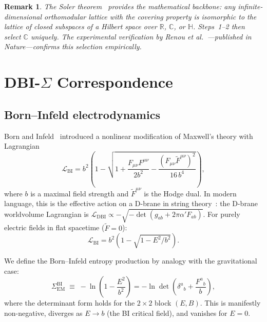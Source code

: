 \documentclass[prl,twocolumn,superscriptaddress,longbibliography]{revtex4-2}
\newtheorem*{remark}{Remark}
\newcommand{\Sem}{\Sigma_{\mathrm{EM}}}
\newcommand{\LBI}{\mathcal{L}_{\mathrm{BI}}}
\begin{document}
\begin{remark}
The Soler theorem~\cite{Solèr1995} provides the mathematical
backbone: any infinite-dimensional orthomodular lattice with
the covering property is isomorphic to the lattice of closed
subspaces of a Hilbert space over $\mathbb{R}$, $\mathbb{C}$,
or $\mathbb{H}$.
Steps~1--2 then select $\mathbb{C}$ uniquely.
The experimental verification by Renou
\textit{et al.}~\cite{Renou2021}---published in
\textit{Nature}---confirms this selection empirically.
\end{remark}

\section{DBI-$\Sigma$ Correspondence}
\label{sec:dbi}

\subsection{Born--Infeld electrodynamics}

Born and Infeld~\cite{BornInfeld1934} introduced a nonlinear
modification of Maxwell's theory with Lagrangian
\begin{equation}
  \LBI = b^2\!\left(1 - \sqrt{1 + \frac{F_{\mu\nu}F^{\mu\nu}}{2b^2}
  - \frac{(F_{\mu\nu}\tilde{F}^{\mu\nu})^2}{16\,b^4}}\right),
  \label{eq:LBI}
\end{equation}
where $b$ is a maximal field strength and $\tilde{F}^{\mu\nu}$
is the Hodge dual.
In modern language, this is the effective action on a D-brane in
string theory~\cite{Polchinski1998,Tseytlin1997}: the D-brane
worldvolume Lagrangian is
$\mathcal{L}_{\mathrm{DBI}} \propto
-\sqrt{-\det(g_{ab} + 2\pi\alpha' F_{ab})}$.
For purely electric fields in flat spacetime ($\tilde{F} = 0$):
\begin{equation}
  \LBI = b^2\!\left(1 - \sqrt{1 - E^2/b^2}\right).
  \label{eq:LBI_electric}
\end{equation}

We define the Born--Infeld entropy production by analogy with
the gravitational case:
\begin{equation}
  \Sem^{\mathrm{BI}} \;\equiv\;
  -\ln\!\left(1 - \frac{E^2}{b^2}\right)
  = -\ln\det\!\left(\delta^a{}_b
  + \frac{F^a{}_b}{b}\right),
  \label{eq:Sigma_BI}
\end{equation}
where the determinant form holds for the $2\times 2$ block
$(E,B)$.
This is manifestly non-negative, diverges as $E \to b$
(the BI critical field), and vanishes for $E = 0$.
\end{document}
